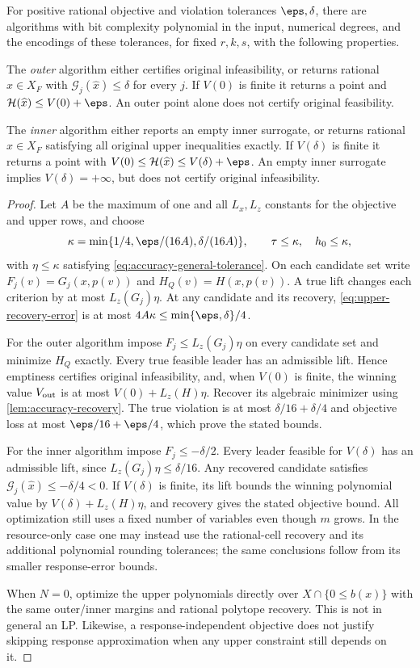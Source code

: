 \begin{theorem}\label{thm:accuracy-upper}
For positive rational objective and violation tolerances $\eps,\delta$,
there are algorithms with bit complexity polynomial in the input,
numerical degrees, and the encodings of these tolerances, for fixed
$r,k,s$, with the following properties.

The \emph{outer} algorithm either certifies original infeasibility, or
returns rational $\widehat x\in X_F$ with
$\mathcal G_j(\widehat x)\le\delta$ for every $j$.
If $V(0)$ is finite it returns a point and
$\mathcal H(\widehat x)\le V(0)+\eps$.
An outer point alone does not certify original feasibility.

The \emph{inner} algorithm either reports an empty inner surrogate, or
returns rational $\widehat x\in X_F$ satisfying all original upper
inequalities exactly. If $V(\delta)$ is finite it returns a point with
$V(0)\le\mathcal H(\widehat x)\le V(\delta)+\eps$.
An empty inner surrogate implies $V(\delta)=+\infty$, but does not
certify original infeasibility.
\end{theorem}
\begin{proof}
Let $A$ be the maximum of one and all $L_x,L_z$ constants for the
objective and upper rows, and choose
\[
 \kappa=\min\{1/4,\eps/(16A),\delta/(16A)\},\qquad
 \tau\le\kappa,\quad h_0\le\kappa,
\]
with $\eta\le\kappa$ satisfying
\eqref{eq:accuracy-general-tolerance}. On each candidate set write
$F_j(v)=G_j(x,p(v))$ and $H_Q(v)=H(x,p(v))$.
A true lift changes each criterion by at most $L_z(G_j)\eta$.
At any candidate and its recovery, \eqref{eq:upper-recovery-error}
is at most $4A\kappa\le\min\{\eps,\delta\}/4$.

For the outer algorithm impose $F_j\le L_z(G_j)\eta$ on every
candidate set and minimize $H_Q$ exactly. Every true feasible leader
has an admissible lift. Hence emptiness certifies original infeasibility,
and, when $V(0)$ is finite, the winning value $V_{\rm out}$ is at
most $V(0)+L_z(H)\eta$. Recover its algebraic minimizer using
\cref{lem:accuracy-recovery}. The true violation is at most
$\delta/16+\delta/4$ and objective loss at most
$\eps/16+\eps/4$, which prove the stated bounds.

For the inner algorithm impose $F_j\le-\delta/2$.
Every leader feasible for $V(\delta)$ has an admissible lift, since
$L_z(G_j)\eta\le\delta/16$. Any recovered candidate satisfies
$\mathcal G_j(\widehat x)\le-\delta/4<0$. If $V(\delta)$ is
finite, its lift bounds the winning polynomial value by
$V(\delta)+L_z(H)\eta$, and recovery gives the stated objective
bound. All optimization still uses a fixed number of variables even
though $m$ grows. In the resource-only case one may instead use the
rational-cell recovery and its additional polynomial rounding tolerances;
the same conclusions follow from its smaller response-error bounds.

When $N=0$, optimize the upper polynomials directly over
$X\cap\{0\le b(x)\}$ with the same outer/inner margins and rational
polytope recovery. This is not in general an LP. Likewise, a
response-independent objective does not justify skipping response
approximation when any upper constraint still depends on it.
\end{proof}

